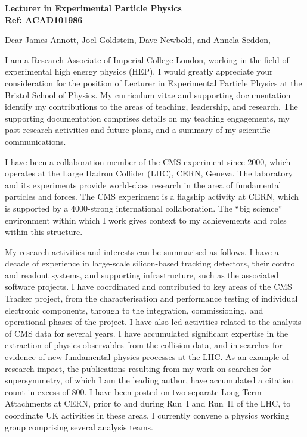 \documentclass[11pt,a4paper,sans]{moderncv}
\title{}%
\begin{document}
\makecvtitle

\vspace{-4.4cm}
\textbf{Lecturer in Experimental Particle Physics} \\
\textbf{Ref: ACAD101986} 
\vspace{2.3cm}

Dear James Annott, Joel Goldstein, Dave Newbold, and Annela Seddon, 

\vspace{0.2cm}

\hspace{0.0cm}I am a Research Associate of Imperial College London,
working in the field of experimental high energy physics (HEP). I
would greatly appreciate your consideration for the position of
Lecturer in Experimental Particle Physics at the Bristol School of
Physics. My curriculum vitae and supporting documentation identify my
contributions to the areas of teaching, leadership, and research. The
supporting documentation comprises details on my teaching engagements,
my past research activities and future plans, and a summary of my
scientific communications.

\vspace{0.1cm}

\hspace{0.0cm}I have been a collaboration member of the CMS experiment
since 2000, which operates at the Large Hadron Collider (LHC), CERN,
Geneva. The laboratory and its experiments provide world-class
research in the area of fundamental particles and forces. The CMS
experiment is a flagship activity at CERN, which is supported by a
4000-strong international collaboration. The ``big science''
environment within which I work gives context to my achievements and
roles within this structure.

\vspace{0.1cm}

\hspace{0.0cm}My research activities and interests can be summarised
as follows. I have a decade of experience in large-scale silicon-based
tracking detectors, their control and readout systems, and supporting
infrastructure, such as the associated software projects. I have
coordinated and contributed to key areas of the CMS Tracker project,
from the characterisation and performance testing of individual
electronic components, through to the integration, commissioning, and
operational phases of the project. I have also led activities related
to the analysis of CMS data for several years. I have accumulated
significant expertise in the extraction of physics observables from
the collision data, and in searches for evidence of new fundamental
physics processes at the LHC. As an example of research impact, the
publications resulting from my work on searches for supersymmetry, of
which I am the leading author, have accumulated a citation count in
excess of 800. I have been posted on two separate Long Term
Attachments at CERN, prior to and during Run~I and Run~II of the LHC,
to coordinate UK activities in these areas. I currently convene a
physics working group comprising several analysis teams.
\end{document}
